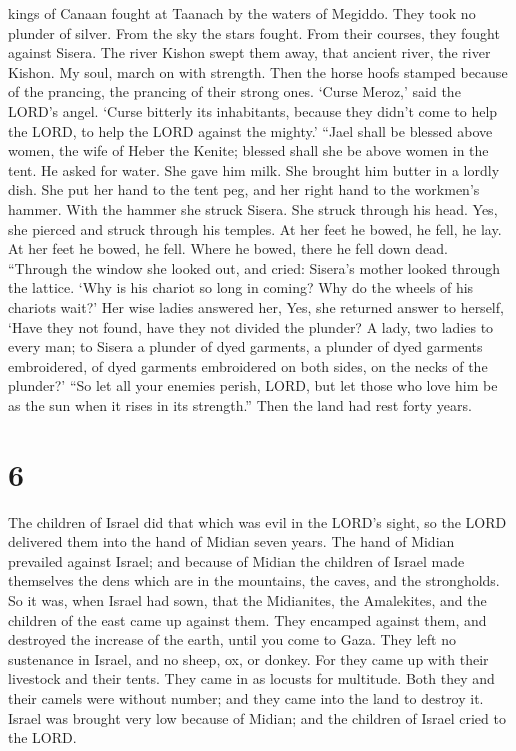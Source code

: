 kings of Canaan fought at Taanach by the waters of Megiddo. They took no
plunder of silver.  From the sky the stars fought. From
their courses, they fought against Sisera.  The river
Kishon swept them away, that ancient river, the river Kishon. My soul,
march on with strength.  Then the horse hoofs stamped
because of the prancing, the prancing of their strong ones.
 `Curse Meroz,' said the LORD's angel. `Curse bitterly
its inhabitants, because they didn't come to help the LORD, to help the
LORD against the mighty.'  ``Jael shall be blessed above
women, the wife of Heber the Kenite; blessed shall she be above women in
the tent.  He asked for water. She gave him milk. She
brought him butter in a lordly dish.  She put her hand to
the tent peg, and her right hand to the workmen's hammer. With the
hammer she struck Sisera. She struck through his head. Yes, she pierced
and struck through his temples.  At her feet he bowed, he
fell, he lay. At her feet he bowed, he fell. Where he bowed, there he
fell down dead.  ``Through the window she looked out, and
cried: Sisera's mother looked through the lattice. `Why is his chariot
so long in coming? Why do the wheels of his chariots wait?'
 Her wise ladies answered her, Yes, she returned answer
to herself,  `Have they not found, have they not divided
the plunder? A lady, two ladies to every man; to Sisera a plunder of
dyed garments, a plunder of dyed garments embroidered, of dyed garments
embroidered on both sides, on the necks of the plunder?' 
``So let all your enemies perish, LORD, but let those who love him be as
the sun when it rises in its strength.'' Then the land had rest forty
years.

\hypertarget{section-5}{%
\section{6}\label{section-5}}

 The children of Israel did that which was evil in the
LORD's sight, so the LORD delivered them into the hand of Midian seven
years.  The hand of Midian prevailed against Israel; and
because of Midian the children of Israel made themselves the dens which
are in the mountains, the caves, and the strongholds.  So
it was, when Israel had sown, that the Midianites, the Amalekites, and
the children of the east came up against them.  They
encamped against them, and destroyed the increase of the earth, until
you come to Gaza. They left no sustenance in Israel, and no sheep, ox,
or donkey.  For they came up with their livestock and
their tents. They came in as locusts for multitude. Both they and their
camels were without number; and they came into the land to destroy it.
 Israel was brought very low because of Midian; and the
children of Israel cried to the LORD.

